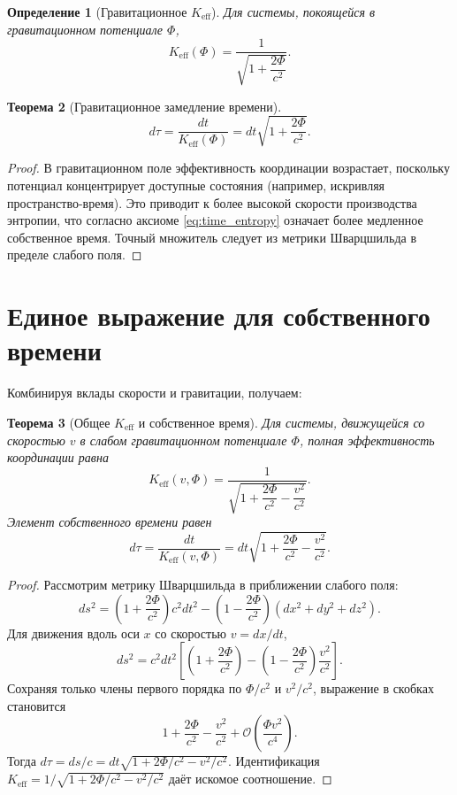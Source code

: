 \documentclass[12pt,a4paper]{article}
\newtheorem{theorem}{Теорема}[section]
\newtheorem{definition}[theorem]{Определение}
\newcommand{\Keff}{K_{\mathrm{eff}}}
\begin{document}
	\begin{definition}[Гравитационное \(\Keff\)]
		Для системы, покоящейся в гравитационном потенциале \(\Phi\),
		\[
		\Keff(\Phi) = \frac{1}{\sqrt{1 + \dfrac{2\Phi}{c^2}}}.
		\]
	\end{definition}
	
	\begin{theorem}[Гравитационное замедление времени]
		\begin{equation}
			d\tau = \frac{dt}{\Keff(\Phi)} = dt\sqrt{1 + \frac{2\Phi}{c^2}}.
		\end{equation}
	\end{theorem}
	
	\begin{proof}
		В гравитационном поле эффективность координации возрастает, поскольку потенциал концентрирует доступные состояния (например, искривляя пространство-время). Это приводит к более высокой скорости производства энтропии, что согласно аксиоме \ref{eq:time_entropy} означает более медленное собственное время. Точный множитель следует из метрики Шварцшильда в пределе слабого поля.
	\end{proof}
	
	\section{Единое выражение для собственного времени}
	\label{sec:unified}
	
	Комбинируя вклады скорости и гравитации, получаем:
	
	\begin{theorem}[Общее \(\Keff\) и собственное время]
		Для системы, движущейся со скоростью \(v\) в слабом гравитационном потенциале \(\Phi\), полная эффективность координации равна
		\begin{equation}
			\Keff(v,\Phi) = \frac{1}{\sqrt{1 + \dfrac{2\Phi}{c^2} - \dfrac{v^2}{c^2}}}.
		\end{equation}
		Элемент собственного времени равен
		\begin{equation}
			d\tau = \frac{dt}{\Keff(v,\Phi)} = dt\sqrt{1 + \frac{2\Phi}{c^2} - \frac{v^2}{c^2}}.
		\end{equation}
	\end{theorem}
	
	\begin{proof}
		Рассмотрим метрику Шварцшильда в приближении слабого поля:
		\[
		ds^2 = \left(1+\frac{2\Phi}{c^2}\right)c^2 dt^2 - \left(1-\frac{2\Phi}{c^2}\right)(dx^2+dy^2+dz^2).
		\]
		Для движения вдоль оси \(x\) со скоростью \(v = dx/dt\),
		\[
		ds^2 = c^2 dt^2\left[ \left(1+\frac{2\Phi}{c^2}\right) - \left(1-\frac{2\Phi}{c^2}\right)\frac{v^2}{c^2} \right].
		\]
		Сохраняя только члены первого порядка по \(\Phi/c^2\) и \(v^2/c^2\), выражение в скобках становится
		\[
		1 + \frac{2\Phi}{c^2} - \frac{v^2}{c^2} + \mathcal{O}\left(\frac{\Phi v^2}{c^4}\right).
		\]
		Тогда \(d\tau = ds/c = dt\sqrt{1 + 2\Phi/c^2 - v^2/c^2}\). Идентификация \(\Keff = 1/\sqrt{1 + 2\Phi/c^2 - v^2/c^2}\) даёт искомое соотношение.
	\end{proof}
	
\end{document}
